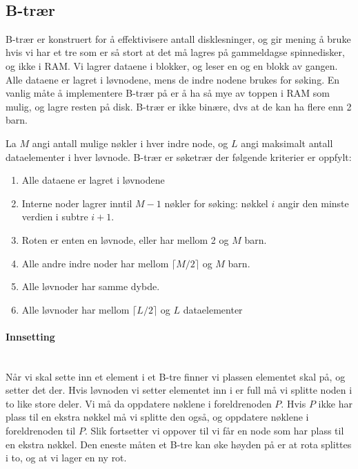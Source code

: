 ~\\
\subsection{B-trær}
B-trær er konstruert for å effektivisere antall disklesninger, og gir mening å bruke hvis vi har et tre som er så stort at det må lagres på gammeldagse spinnedisker, og ikke i RAM. Vi lagrer dataene i blokker, og leser en og en blokk av gangen. Alle dataene er lagret i løvnodene, mens de indre nodene brukes for søking. En vanlig måte å implementere B-trær på er å ha så mye av toppen i RAM som mulig, og lagre resten på disk. B-trær er ikke binære, dvs at de kan ha flere enn 2 barn. 

\begin{definisjon} La $ M $ angi antall mulige nøkler i hver indre node, og $ L $ angi maksimalt antall dataelementer i hver løvnode. B-trær er søketrær der følgende kriterier er oppfylt:
\begin{enumerate}[i]
\item Alle dataene er lagret i løvnodene
\item Interne noder lagrer inntil $ M-1 $ nøkler for søking: nøkkel $ i $ angir den minste verdien i subtre $ i+1 $.
\item Roten er enten en løvnode, eller har mellom 2 og $ M $ barn. 
\item Alle andre indre noder har mellom $ \lceil M/2\rceil $ og $ M $ barn. 
\item Alle løvnoder har samme dybde.
\item Alle løvnoder har mellom $ \lceil L/2\rceil $ og $ L $ dataelementer
\end{enumerate}
\label{def:b_tre}
\end{definisjon}


\paragraph{Innsetting}~\\
Når vi skal sette inn et element i et B-tre finner vi plassen elementet skal på, og setter det der. Hvis løvnoden vi setter elementet inn i er full må vi splitte noden i to like store deler. Vi må da oppdatere nøklene i foreldrenoden $ P $. Hvis $ P $ ikke har plass til en ekstra nøkkel må vi splitte den også, og oppdatere nøklene i foreldrenoden til $ P $. Slik fortsetter vi oppover til vi får en node som har plass til en ekstra nøkkel. Den eneste måten et B-tre kan øke høyden på er at rota splittes i to, og at vi lager en ny rot. 


